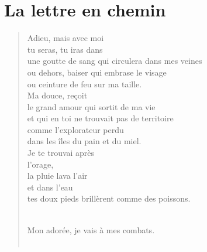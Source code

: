 \documentclass[11pt,a4paper]{book}
\begin{document}
\cleardoublepage

\part{La lettre en chemin}

\cleardoublepage

\begin{verse}
Adieu, mais avec moi \\
tu seras, tu iras dans \\
une goutte de sang qui circulera dans mes veines \\
ou dehors, baiser qui embrase le visage \\
ou ceinture de feu sur ma taille. \\
Ma douce, re\c{c}oit \\
le grand amour qui sortit de ma vie \\
et qui en toi ne trouvait pas de territoire \\
comme l'explorateur perdu \\
dans les îles du pain et du miel. \\
Je te trouvai après \\
l'orage, \\
la pluie lava l'air \\
et dans l'eau \\
tes doux pieds brillèrent comme des poissons. \\ \

Mon adorée, je vais à mes combats. \\ \


\end{verse}
\end{document}
